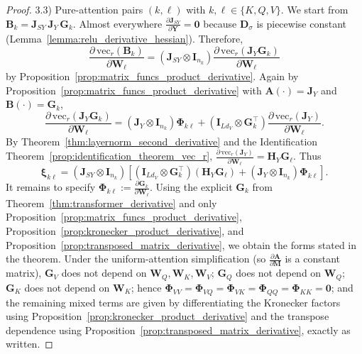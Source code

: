 \documentclass{article}
\begin{document}
\begin{proof}
3.3) Pure-attention pairs $(k,\ell)$ with $k,\ell \in \{K,Q,V\}$.
We start from $\mathbf{B}_k = \mathbf{J}_{SY}\, \mathbf{J}_Y \, \mathbf{G}_k$. Almost everywhere $\frac{\partial \mathbf{J}_{SY}}{\partial \mathbf{Y}} = \mathbf{0}$ because $\mathbf{D}_\sigma$ is piecewise constant (Lemma~\ref{lemma:relu_derivative_hessian}). Therefore,
\[\frac{\partial\,\mathrm{vec}_r(\mathbf{B}_k)}{\partial \mathbf{W}_\ell}= (\mathbf{J}_{SY} \otimes \mathbf{I}_{n_k}) \frac{\partial\,\mathrm{vec}_r(\mathbf{J}_Y \mathbf{G}_k)}{\partial \mathbf{W}_\ell}\]
by Proposition~\ref{prop:matrix_funcs_product_derivative}.
Again by Proposition~\ref{prop:matrix_funcs_product_derivative} with $\mathbf{A}(\cdot)=\mathbf{J}_Y$ and $\mathbf{B}(\cdot)=\mathbf{G}_k$,
\[\frac{\partial\,\mathrm{vec}_r(\mathbf{J}_Y \mathbf{G}_k)}{\partial \mathbf{W}_\ell}= (\mathbf{J}_Y \otimes \mathbf{I}_{n_k}) \boldsymbol{\Phi}_{k\ell}+ \left( \mathbf{I}_{L d_V} \otimes \mathbf{G}_k^\top \right) \frac{\partial\,\mathrm{vec}_r(\mathbf{J}_Y)}{\partial \mathbf{W}_\ell}.\]
By Theorem~\ref{thm:layernorm_second_derivative} and the Identification Theorem~\ref{prop:identification_theorem_vec_r},
$\frac{\partial\,\mathrm{vec}_r(\mathbf{J}_Y)}{\partial \mathbf{W}_\ell} = \mathbf{H}_Y \mathbf{G}_\ell$.
Thus
\[\boldsymbol{\xi}_{k\ell} = \left( \mathbf{J}_{SY} \otimes \mathbf{I}_{n_k} \right)\left[\left( \mathbf{I}_{L d_V} \otimes \mathbf{G}_k^\top \right) \left( \mathbf{H}_Y \mathbf{G}_\ell \right)+ \left( \mathbf{J}_Y \otimes \mathbf{I}_{n_k} \right) \boldsymbol{\Phi}_{k\ell}\right].
\]
It remains to specify $\boldsymbol{\Phi}_{k\ell} := \frac{\partial \mathbf{G}_k}{\partial \mathbf{W}_\ell}$. Using the explicit $\mathbf{G}_k$ from Theorem~\ref{thm:transformer_derivative} and only Proposition~\ref{prop:matrix_funcs_product_derivative}, Proposition~\ref{prop:kronecker_product_derivative}, and Proposition~\ref{prop:transposed_matrix_derivative}, we obtain the forms stated in the theorem. Under the uniform-attention simplification (so $\frac{\partial \mathbf{A}}{\partial \mathbf{M}}$ is a constant matrix), $\mathbf{G}_V$ does not depend on $\mathbf{W}_Q,\mathbf{W}_K,\mathbf{W}_V$; $\mathbf{G}_Q$ does not depend on $\mathbf{W}_Q$; $\mathbf{G}_K$ does not depend on $\mathbf{W}_K$; hence $\boldsymbol{\Phi}_{VV}=\boldsymbol{\Phi}_{VQ}=\boldsymbol{\Phi}_{VK}=\boldsymbol{\Phi}_{QQ}=\boldsymbol{\Phi}_{KK}=\mathbf{0}$; and the remaining mixed terms are given by differentiating the Kronecker factors using Proposition~\ref{prop:kronecker_product_derivative} and the transpose dependence using Proposition~\ref{prop:transposed_matrix_derivative}, exactly as written.


\end{proof}
\end{document}
